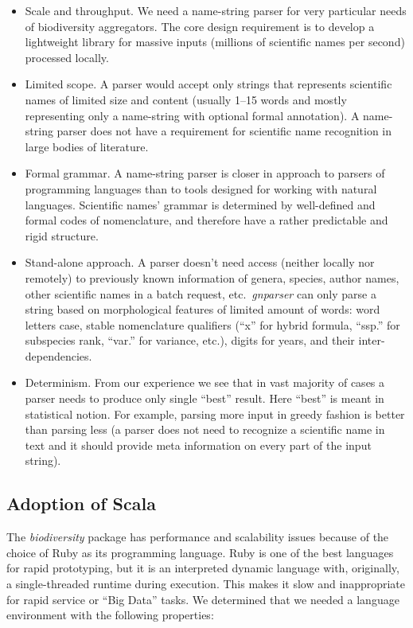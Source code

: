 \documentclass{bmcart}
\begin{document}
\begin{itemize}
  \item Scale and throughput. We need a name-string parser for very particular needs of biodiversity aggregators. The core design requirement is to develop a lightweight library for massive inputs (millions of scientific names per second) processed locally.

  \item Limited scope. A parser would accept only strings that represents scientific names of limited size and content (usually 1--15 words and mostly representing only a name-string with optional formal annotation). A name-string parser does not have a requirement for scientific name recognition in large bodies of literature.

  \item Formal grammar. A name-string parser is closer in approach to parsers of programming languages than to tools designed for working with natural languages. Scientific names' grammar is determined by well-defined and formal codes of nomenclature, and therefore have a rather predictable and rigid structure.

  \item Stand-alone approach. A parser doesn't need access (neither locally nor remotely) to previously known information of genera, species, author names, other scientific names in a batch request, etc.\ \textit{gnparser} can only parse a string based on morphological features of limited amount of words: word letters case, stable nomenclature qualifiers (``x'' for hybrid formula, ``ssp.'' for subspecies rank, ``var.'' for variance, etc.), digits for years, and their inter-dependencies.

  \item Determinism. From our experience we see that in vast majority of cases a parser needs to produce only single ``best'' result. Here ``best'' is meant in statistical notion. For example, parsing more input in greedy fashion is better than parsing less (a parser does not need to recognize a scientific name in text and it should provide meta information on every part of the input string).
\end{itemize}

\subsection*{Adoption of Scala}

The \textit{biodiversity} package has performance and scalability issues because of the choice of Ruby as its programming language. Ruby is one of the best languages for rapid prototyping, but it is an interpreted dynamic language with, originally, a single-threaded runtime during execution. This makes it slow and inappropriate for rapid service or ``Big Data'' tasks. We determined that we needed a language environment with the following properties:
\end{document}
